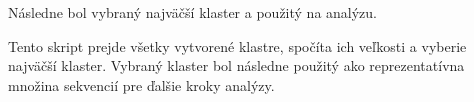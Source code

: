 Následne bol vybraný najväčší klaster a použitý na analýzu.

Tento skript prejde všetky vytvorené klastre, spočíta ich veľkosti a vyberie najväčší klaster. Vybraný klaster bol následne použitý ako reprezentatívna množina sekvencií pre ďalšie kroky analýzy.
